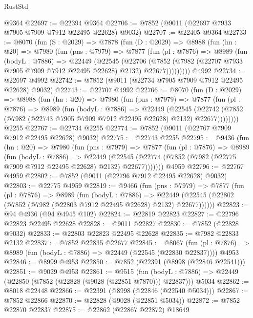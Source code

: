 \begin{lexlean}{RustStd}
\begin{coremodule}
    @9364
@22697 := @22394 @9364
@22706 := @7852 (@9011 (@22697 @7933 @7905 @7909 @7912 @22495 @22628) @9032)
@22707 := @22405 @9364
@22733 := @8070
    (fun (S : @2029) =>
    @7878
      (fun (D : @2029) =>
      @8988
        (fun (hn : @20) =>
        @7980
          (fun (pns : @7979) =>
          @7877
            (fun (pl : @7876) =>
            @8989
              (fun (bodyL : @7886) =>
              @22449
                (@22545
                  (@22706
                    (@7852
                      (@7982 (@22707 @7933 @7905 @7909 @7912 @22495 @22628) @2132)
                      @22677)))))))))
    @4992
@22734 := @22697 @4992
@22742 := @7852 (@9011 (@22734 @7905 @7909 @7912 @22495 @22628) @9032)
@22743 := @22707 @4992
@22766 := @8070
    (fun (D : @2029) =>
    @8988
      (fun (hn : @20) =>
      @7980
        (fun (pns : @7979) =>
        @7877
          (fun (pl : @7876) =>
          @8989
            (fun (bodyL : @7886) =>
            @22449
              (@22545
                (@22742 (@7852 (@7982 (@22743 @7905 @7909 @7912 @22495 @22628) @2132) @22677))))))))
    @2255
@22767 := @22734 @2255
@22774 := @7852 (@9011 (@22767 @7909 @7912 @22495 @22628) @9032)
@22775 := @22743 @2255
@22795 := @9436
    (fun (hn : @20) =>
    @7980
      (fun (pns : @7979) =>
      @7877
        (fun (pl : @7876) =>
        @8989
          (fun (bodyL : @7886) =>
          @22449
            (@22545 (@22774 (@7852 (@7982 (@22775 @7909 @7912 @22495 @22628) @2132) @22677)))))))
    @4959
@22796 := @22767 @4959
@22802 := @7852 (@9011 (@22796 @7912 @22495 @22628) @9032)
@22803 := @22775 @4959
@22819 := @9466
    (fun (pns : @7979) =>
    @7877
      (fun (pl : @7876) =>
      @8989
        (fun (bodyL : @7886) =>
        @22449 (@22545 (@22802 (@7852 (@7982 (@22803 @7912 @22495 @22628) @2132) @22677))))))
@22823 := @94 @4936 (@94 @4945 @102)
@22824 := @22819 @22823
@22827 := @22796 @22823 @22495 @22628
@22828 := @9011 @22827
@22830 := @7852 (@22828 @9032)
@22833 := @22803 @22823 @22495 @22628
@22835 := @7982 @22833 @2132
@22837 := @7852 @22835 @22677
@22845 := @8067
    (fun (pl : @7876) => @8989 (fun (bodyL : @7886) => @22449 (@22545 (@22830 @22837))))
    @4953
@22846 := @8999 @4953
@22850 := @7852 (@22391 (@8998 (@22846 @22541)))
@22851 := @9029 @4953
@22861 := @9515
    (fun (bodyL : @7886) => @22449 (@22850 (@7852 (@22828 (@9028 (@22851 @7870))) @22837)))
    @5034
@22862 := @8018 @22448
@22866 := @22391 (@8998 (@22846 (@22540 @5034)))
@22867 := @7852 @22866
@22870 := @22828 (@9028 (@22851 @5034))
@22872 := @7852 @22870 @22837
@22875 := @22862 (@22867 @22872) @18649

\end{coremodule}
\end{lexlean}
